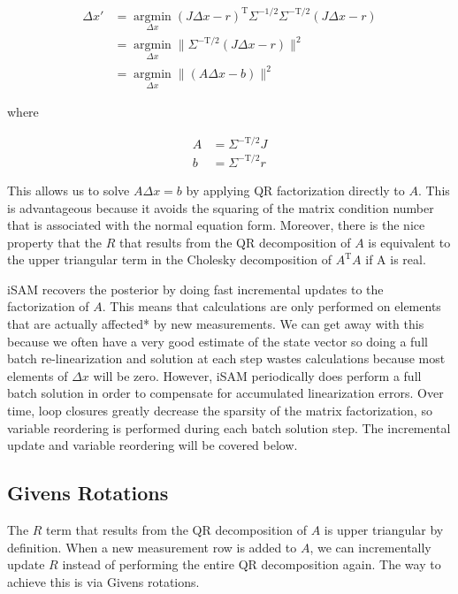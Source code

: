 \documentclass[conference]{IEEEtran}
\begin{document}
\begin{align*}
    \Delta x' &= \underset{\Delta x}{\operatorname{argmin}} (J\Delta x - r)^{\text{T}}
\Sigma^{-1/2}\Sigma^{-\text{T}/2} (J\Delta x - r) \\
  &= \underset{\Delta x}{\operatorname{argmin}} \| \Sigma^{-\text{T}/2}(J\Delta x - r)
  \|^2\\
&= \underset{\Delta x}{\operatorname{argmin}} \| (A\Delta x - b)\|^2
\end{align*}

where

\begin{align*}
  A &= \Sigma^{-\text{T}/2}J \\
  b &= \Sigma^{-\text{T}/2}r
\end{align*}

This allows us to solve $A\Delta x = b$ by applying QR factorization directly to $A$. This
is advantageous because it avoids the squaring of the matrix condition number that is
associated with the normal equation form. Moreover, there is the nice property that the
$R$ that results from the QR decomposition of $A$ is equivalent to the upper triangular
term in the Cholesky decomposition of $A^{\text{T}}A$ if A is real. \cite{Kaess08tro}

iSAM recovers the posterior by doing fast incremental updates to the factorization of $A$.
This means that calculations are only performed on elements that are actually affected* by
 new measurements. We can get away with this because we often have a very good estimate of
 the state vector so doing a full batch re-linearization and solution at each step wastes
 calculations because most elements of $\Delta x$ will be zero. However, iSAM periodically
 does perform a full batch solution in order to compensate for accumulated linearization
 errors. Over time, loop closures greatly decrease the sparsity of the matrix
 factorization, so variable reordering is performed during each batch solution step. The
 incremental update and variable reordering will be covered below.


\subsection{Givens Rotations}
\label{sub:givensrotations}

The $R$ term that results from the QR decomposition of $A$ is upper triangular by
definition. When a new measurement row is added to $A$, we can incrementally update $R$
instead of performing the entire QR decomposition again. The way to achieve this is via
Givens rotations. 
\end{document}
